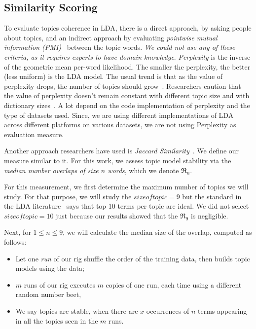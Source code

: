 \documentclass[10pt,conference]{IEEEtran}
\newcommand{\bi}{\begin{itemize}}
\newcommand{\ei}{\end{itemize}}
\theoremstyle{break}
\begin{document}
\subsection{Similarity Scoring}
To evaluate topics coherence in LDA, there is a direct approach, by asking people about topics, and an indirect approach by evaluating \textit{pointwise mutual information (PMI)}~\cite{lau2014machine, o2015analysis} between the topic words. {\em We could not use any of these criteria, as it requires experts to have domain knowledge}. \textit{Perplexity} is  the inverse of the geometric mean per-word likelihood. The smaller the perplexity, the better (less uniform) is the LDA model. The usual trend is that as the value of perplexity drops, the number of topics should grow~\cite{koltcov2014latent}. Researchers caution that the value of perplexity doesn't remain constant with different topic size and with dictionary sizes~\cite{koltcov2014latent, zhao2015heuristic}. A lot depend on the code implementation of perplexity and the type of datasets used. Since, we are using different implementations of LDA across different platforms on various datasets, we are not using Perplexity as evaluation measure.

Another approach researchers have used is \textit{Jaccard Similarity}~\cite{o2015analysis, galvis2013analysis}. We define our measure similar to it. For this work, we assess topic model stability via the {\em median number overlaps of size $n$ words}, which we denote  $\Re_n$.

For this measurement, we first determine the maximum number of topics we will study. For that purpose,
we will study the $\mathit{size of topic}=9$ but the standard in the LDA literature~\cite{panichella2013effectively, lukins2010bug} says that top 10 terms per topic are ideal. We did not select $\mathit{size of topic}=10$ just because our results showed that the $\Re_9$ is negligible.

Next, for $1 \le n \le 9$, we will calculate the median size of the overlap,
computed as follows:
\bi
\item Let one {\em run} of our rig shuffle the order of the training data, then builds topic models using the data;
  \item $m$ runs of our rig executes $m$ copies of one run, each time using a different random number beet,
\item We say topics are stable,
when there are $x$ occurrences of  $n$ terms appearing in all the topics seen in the $m$ runs.
\ei
\end{document}
